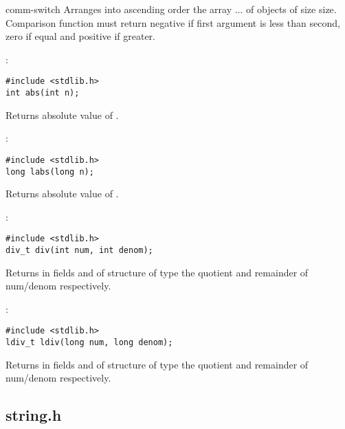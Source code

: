 \begin{Ventry2}{comm-switch  }
     Arranges into ascending order the array
     ... of objects of size size. Comparison
     function  must return negative if first argument is less than
     second, zero if equal and positive if greater.

\item[abs]
\label{item:abs}
:
\begin{production}
\begin{verbatim}
#include <stdlib.h>
int abs(int n);
\end{verbatim}
\end{production}

     Returns absolute value of .

\item[labs]
\label{item:labs}
:
\begin{production}
\begin{verbatim}
#include <stdlib.h>
long labs(long n);
\end{verbatim}
\end{production}

     Returns absolute value of .

\item[div]
\label{item:div}
:
\begin{production}
\begin{verbatim}
#include <stdlib.h>
div_t div(int num, int denom);
\end{verbatim}
\end{production}

     Returns in fields  and  of structure of type
      the quotient and remainder of num/denom respectively.

\item[ldiv]
\label{item:ldiv}
:
\begin{production}
\begin{verbatim}
#include <stdlib.h>
ldiv_t ldiv(long num, long denom);
\end{verbatim}
\end{production}

     Returns in fields  and  of structure of type
      the quotient and remainder of num/denom respectively.


\end{Ventry2}



\subsection{string.h}
\label{sec:stringh}

